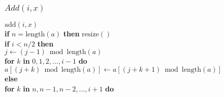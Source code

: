 \documentclass{beamer}
\begin{document}
\begin{frame}
\frametitle{$Add(i,x)$}
\begin{oframed}
\begin{flushleft}
\hspace*{1em} $\ensuremath{\mathrm{add}(\ensuremath{\mathit{i}}, \ensuremath{\mathit{x}})}$ \\

\hspace*{1em} \hspace*{1em} {\color{black} \textbf{if}} $\ensuremath{\ensuremath{\mathit{n}} = \mathrm{length}(\ensuremath{\mathit{a}})}$ {\color{black} \textbf{then}}  $\ensuremath{\mathrm{resize}()}$\\
\hspace*{1em} \hspace*{1em} {\color{black} \textbf{if}} $\ensuremath{\ensuremath{\mathit{i}} < \ensuremath{\mathit{n}}/2}$ {\color{black} \textbf{then}} \\
\hspace*{1em} \hspace*{1em} \hspace*{1em} $\ensuremath{\ensuremath{\mathit{j}} \gets  \ensuremath{(\ensuremath{\mathit{j}}-1) \bmod  \mathrm{length}(\ensuremath{\mathit{a}})}}$\\
\hspace*{1em} \hspace*{1em} \hspace*{1em} {\color{black} \textbf{for}} $\ensuremath{k}$ {\color{black} \textbf{in}} $\ensuremath{0,1,2,\ldots,\ensuremath{\mathit{i}}-1}$ {\color{black} \textbf{do}} \\
\hspace*{1em} \hspace*{1em} \hspace*{1em} \hspace*{1em} $\ensuremath{\ensuremath{\mathit{a}}[\ensuremath{(\ensuremath{\mathit{j}}+\ensuremath{\mathit{k}})\bmod \mathrm{length}(\ensuremath{\mathit{a}})}] \gets  \ensuremath{\ensuremath{\mathit{a}}[(\ensuremath{\mathit{j}}+\ensuremath{\mathit{k}}+1)\bmod \mathrm{length}(\ensuremath{\mathit{a}})]}}$\\
\hspace*{1em} \hspace*{1em} {\color{black} \textbf{else}} \\
\hspace*{1em} \hspace*{1em} \hspace*{1em} {\color{black} \textbf{for}} $\ensuremath{k}$ {\color{black} \textbf{in}} $\ensuremath{\ensuremath{\mathit{n}},\ensuremath{\mathit{n}}-1,\ensuremath{\mathit{n}}-2,\ldots,\ensuremath{\mathit{i}}+1}$ {\color{black} \textbf{do}} \\

\end{flushleft}
\end{oframed}
\end{frame}
\end{document}
